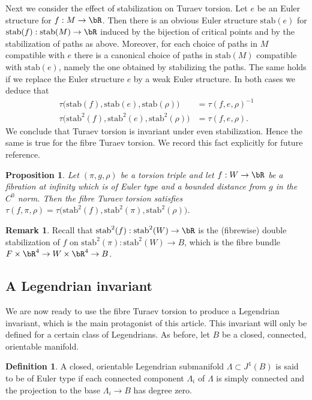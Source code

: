 \documentclass[JEP,XML,SOM,Unicode,NoFloatCountersInSection]{cedram}
\newcommand{\stab}{\mathrm{stab}}
\theoremstyle{plain}
\newtheorem{proposition}[theorem]{Proposition}
\theoremstyle{definition}
\newtheorem{definition}[theorem]{Definition}
\newtheorem{remark}[theorem]{Remark}
\begin{document}
Next we consider the effect of stabilization on Turaev torsion. Let $e$ be an Euler structure for $f:M \to \bR$. Then there is an obvious Euler structure $\stab (e)$ for $\stab (f) : \stab (M) \to \bR$ induced by the bijection of critical points and by the stabilization of paths as above. Moreover, for each choice of paths in $M$ compatible with $e$ there is a canonical choice of paths in $\stab (M)$ compatible with $\stab (e)$, namely the one obtained by stabilizing the paths. The same holds if we replace the Euler structure $e$ by a weak Euler structure. In both cases we deduce that
\begin{align*}
\tau\big(\stab (f), \stab (e), \stab (\rho) \big) &= \tau(f,e,\rho)^{-1} \\ \tag*{and} \tau\big(\stab ^2(f), \stab ^2(e), \stab ^2(\rho) \big) &= \tau(f,e, \rho).
\end{align*}
We conclude that Turaev torsion is invariant under even stabilization. Hence the same is true for the fibre Turaev torsion. We record this fact explicitly for future reference.

\begin{proposition}\label{Proposition: turaev stability} Let $(\pi,g,\rho)$ be a torsion triple and let $f:W \to \bR$ be a fibration at infinity which is of Euler type and a bounded distance from $g$ in the $C^0$ norm. Then the fibre Turaev torsion satisfies $\tau(f, \pi, \rho) = \tau\big( \stab ^2(f), \stab ^2(\pi), \stab ^2(\rho) \big)$.
\end{proposition}

\begin{remark} Recall that $\stab ^2(f) : \stab ^2(W) \to \bR$ is the (fibrewise) double stabilization of $f$ on $\stab ^2(\pi):\stab ^2(W) \to B$, which is the fibre bundle $F \times \bR^4 \to W \times \bR^4 \to B$. \end{remark}

\subsection{A Legendrian invariant}\label{sec: invariant}

We are now ready to use the fibre Turaev torsion to produce a Legendrian invariant, which is the main protagonist of this article. This invariant will only be defined for a certain class of Legendrians. As before, let $B$ be a closed, connected, orientable manifold.

\begin{definition}
A closed, orientable Legendrian submanifold $\Lambda \subset J^1(B)$ is said to be of Euler type if each connected component $\Lambda_i$ of $\Lambda$ is simply connected and the projection to the base $\Lambda_i \to B$ has degree zero. \end{definition}
\end{document}
